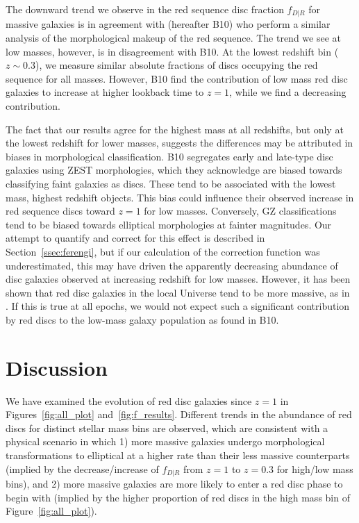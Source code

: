 \documentclass[useAMS,usenatbib]{mn2e}
\begin{document}
The downward trend we observe in the red sequence disc fraction $f_{D|R}$ for massive galaxies is in agreement with \citet{Bundy2010} (hereafter B10) who perform a similar analysis of the morphological makeup of the red sequence. The trend we see at low masses, however, is in disagreement with B10. At the lowest redshift bin ($z\sim0.3$), we measure similar absolute fractions of discs occupying the red sequence for all masses. However, B10 find the contribution of low mass red disc galaxies to increase at higher lookback time to $z=1$, while we find a decreasing contribution. 

The fact that our results agree for the highest mass at all redshifts, but only at the lowest redshift for lower masses, suggests the differences may be attributed in biases in morphological classification. B10 segregates early and late-type disc galaxies using ZEST \citep{Scarlata2007} morphologies, which they acknowledge are biased towards classifying faint galaxies as discs. These tend to be associated with the lowest mass, highest redshift objects. This bias could influence their observed increase in red sequence discs toward $z=1$ for low masses. Conversely, GZ classifications tend to be biased towards elliptical morphologies at fainter magnitudes. Our attempt to quantify and correct for this effect is described in Section~\ref{ssec:ferengi}, but if our calculation of the correction function was underestimated, this may have driven the apparently decreasing abundance of disc galaxies observed at increasing redshift for low masses. However, it has been shown that red disc galaxies in the local Universe tend to be more massive, as in \citet{Masters2010}. If this is true at all epochs, we would not expect such a significant contribution by red discs to the low-mass galaxy population as found in B10.

\section{Discussion}
\label{sec:discussion}
We have examined the evolution of red disc galaxies since $z=1$ in Figures~\ref{fig:all_plot} and~\ref{fig:f_results}. Different trends in the abundance of red discs for distinct stellar mass bins are observed, which are consistent with a physical scenario in which 1) more massive galaxies undergo morphological transformations to elliptical at a higher rate than their less massive counterparts (implied by the decrease/increase of $f_{D|R}$ from $z=1$ to $z=0.3$ for high/low mass bins), and 2) more massive galaxies are more likely to enter a red disc phase to begin with (implied by the higher proportion of red discs in the high mass bin of Figure~\ref{fig:all_plot}). 
\end{document}
